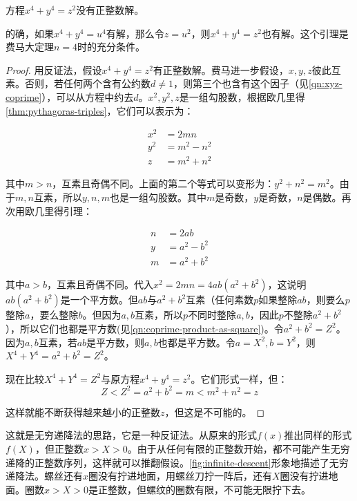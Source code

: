 \documentclass[b5paper]{ctexart}
\begin{document}
\begin{lemma}
方程$x^4 + y^4 = z^2$没有正整数解。
\end{lemma}

的确，如果$x^4 + y^4 = u^4$有解，那么令$z = u^2$，则$x^4 + y^4 = z^2$也有解。这个引理是费马大定理$n = 4$时的充分条件。

\begin{proof}
用反证法，假设$x^4 + y^4 = z^2$有正整数解。费马进一步假设，$x, y, z$彼此互素。否则，若任何两个含有公约数$d \ne 1$，则第三个也含有这个因子（见\cref{qn:xyz-coprime}），可以从方程中约去$d$。$x^2, y^2, z$是一组勾股数，根据欧几里得\cref{thm:pythagoras-triples}，它们可以表示为：

\begin{align*}
x^2 &= 2mn \\
y^2 &= m^2 - n^2 \\
z &= m^2 + n^2
\end{align*}

其中$m > n$，互素且奇偶不同。上面的第二个等式可以变形为：$y^2 + n^2 = m^2$。由于$m, n$互素，所以$y, n, m$也是一组勾股数。其中$m$是奇数，$y$是奇数，$n$是偶数。再次用欧几里得引理：

\begin{align*}
n &= 2ab \\
y &= a^2 - b^2 \\
m &= a^2 + b^2
\end{align*}

其中$a > b$，互素且奇偶不同。代入$x^2 = 2mn = 4ab(a^2 + b^2)$，这说明$ab(a^2 + b^2)$是一个平方数。但$ab$与$a^2 + b^2$互素（任何素数$p$如果整除$ab$，则要么$p$整除$a$，要么整除$b$。但因为$a, b$互素，所以$p$不同时整除$a, b$，因此$p$不整除$a^2 + b^2$），所以它们也都是平方数(见\cref{qn:coprime-product-as-square})。令$a^2 + b^2 = Z^2$。因为$a, b$互素，若$ab$是平方数，则$a, b$也都是平方数。令$a = X^2, b= Y^2$，则$X^4 + Y^4 = a^2 + b^2 = Z^2$。

现在比较$X^4 + Y^4 = Z^2$与原方程$x^4 + y^4 = z^2$。它们形式一样，但：
\[
Z < Z^2 = a^2 + b^2 = m < m^2 + n^2 = z
\]

这样就能不断获得越来越小的正整数$z$，但这是不可能的。
\end{proof}

这就是无穷递降法的思路，它是一种反证法。从原来的形式$f(x)$推出同样的形式$f(X)$，但正整数$x > X > 0$。由于从任何有限的正整数开始，都不可能产生无穷递降的正整数序列，这样就可以推翻假设。\cref{fig:infinite-descent}形象地描述了无穷递降法。螺丝还有$x$圈没有拧进地面，用螺丝刀拧一阵后，还有$X$圈没有拧进地面。圈数$x > X > 0$是正整数，但螺纹的圈数有限，不可能无限拧下去。
\end{document}
